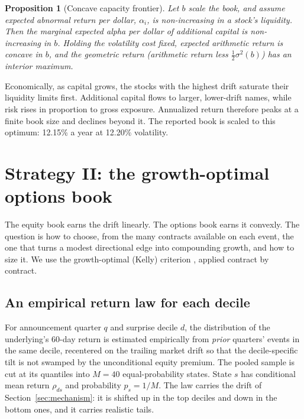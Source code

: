 \documentclass[11pt]{article}
\newtheorem{proposition}{Proposition}
\theoremstyle{definition}
\newcommand{\1}{\mathbf{1}}
\begin{document}
\begin{proposition}[Concave capacity frontier]\label{prop:capacity}
Let $b$ scale the book, and assume expected abnormal return per dollar, $\alpha_i$, is
non-increasing in a stock's liquidity. Then the marginal expected alpha per dollar of
additional capital is non-increasing in $b$. Holding the volatility cost fixed, expected
arithmetic return is concave in $b$, and the geometric return (arithmetic return less
$\tfrac12\sigma^2(b)$) has an interior maximum.
\end{proposition}

Economically, as capital grows, the stocks with the highest drift saturate their liquidity
limits first. Additional capital flows to larger, lower-drift names, while risk rises in
proportion to gross exposure. Annualized return therefore peaks at a finite book size and
declines beyond it. The reported book is scaled to this optimum: 12.15\% a year at 12.20\% volatility.

\section{Strategy II: the growth-optimal options book}\label{sec:options}

The equity book earns the drift linearly. The options book earns it convexly. The question
is how to choose, from the many contracts available on each event, the one that turns a
modest directional edge into compounding growth, and how to size it. We use the growth-optimal
(Kelly) criterion \citep{Kelly1956,MacLeanThorpZiemba2011}, applied contract by contract.

\subsection{An empirical return law for each decile}

For announcement quarter $q$ and surprise decile $d$, the distribution of the underlying's
60-day return is estimated empirically from \emph{prior} quarters' events in the same
decile, recentered on the trailing market drift so that the decile-specific tilt is not
swamped by the unconditional equity premium. The pooled sample is cut at its quantiles into
$M=40$ equal-probability states. State $s$ has conditional mean return $\rho_{ds}$ and
probability $p_s=1/M$. The law carries the drift of Section~\ref{sec:mechanism}: it is
shifted up in the top deciles and down in the bottom ones, and it carries realistic tails.
\end{document}
